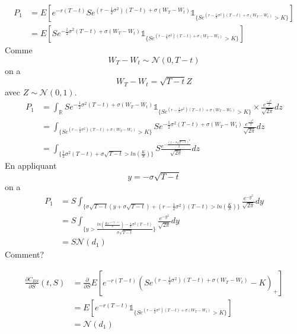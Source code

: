 \documentclass{article}
\theoremstyle{plain}
\theoremstyle{definition}
\begin{document}
\begin{equation}
\begin{split}
P_1&=E[e^{-r(T-t)}Se^{(r-\frac{1}{2}\sigma^2)(T-t)+\sigma(W_T-W_t)}\mathds{1}_{\{Se^{(r-\frac{1}{2}\sigma^2)(T-t)+\sigma(W_T-W_t)}>K\}}]\\
&=E[Se^{-\frac{1}{2}\sigma^2(T-t)+\sigma(W_T-W_t)}\mathds{1}_{\{Se^{(r-\frac{1}{2}\sigma^2)(T-t)+\sigma(W_T-W_t)}>K\}}]
\end{split}
\end{equation}
Comme
\begin{equation}
W_T-W_t\sim\mathcal{N}(0,T-t)
\end{equation}
on a
\begin{equation}
W_T-W_t=\sqrt{T-t}Z
\end{equation}
avec $Z\sim \mathcal{N}(0,1)$.
\begin{equation}
\begin{split}
P_1&=\int_{\mathbb{R}}Se^{-\frac{1}{2}\sigma^2(T-t)+\sigma(W_T-W_t)}\mathds{1}_{\{Se^{(r-\frac{1}{2}\sigma^2)(T-t)+\sigma(W_T-W_t)}>K\}}\times \frac{e^{\frac{-z^2}{2}}}{\sqrt{2\pi}}dz\\
&=\int_{\{Se^{(r-\frac{1}{2}\sigma^2)(T-t)+\sigma(W_T-W_t)}>K\}} Se^{-\frac{1}{2}\sigma^2(T-t)+\sigma(W_T-W_t)}\frac{e^{\frac{-z^2}{2}}}{\sqrt{2\pi}}dz\\
&=\int_{\{\frac{1}{2}\sigma^2(T-t)+\sigma\sqrt{T-t}>ln(\frac{K}{S})\}} S\frac{e^{-\frac{(z-\sigma\sqrt{T-t})^2}{2}}}{\sqrt{2\pi}}dz
\end{split}
\end{equation}
En appliquant
\begin{equation}
	y=-\sigma\sqrt{T-t}
\end{equation}
on a
\begin{equation}
\begin{split}
P_1&=S\int_{\{\sigma\sqrt{T-t}(y+\sigma\sqrt{T-t})+(r-\frac{1}{2}\sigma^2)(T-t)>ln(\frac{K}{S})\}}\frac{e^{-y^2}}{\sqrt{2\pi}}dy\\
&=S\int_{\{y>\frac{ln(\frac{Ke^{-r(T-t)}}{S})-\frac{1}{2}\sigma^2(T-t)}{\sigma\sqrt{T-t}}\}}\frac{e^{-y^2}}{\sqrt{2\pi}}dy\\
&=S\mathcal{N}(d_1)
\end{split}
\end{equation}
{\color{red} Comment?}

\begin{equation}
\begin{split}
\frac{\partial C_{BS}}{\partial S}(t,S)&=\frac{\partial}{\partial S}E[e^{-r(T-t)}(Se^{(r-\frac{1}{2}\sigma^2)(T-t)+\sigma(W_T-W_t)}-K)_+]\\
&=E[e^{-r(T-t)}\mathds{1}_{\{Se^{(r-\frac{1}{2}\sigma^2)(T-t)+\sigma(W_T-W_t)}>K\}}]\\
&=\mathcal{N}(d_1)
\end{split}
\end{equation}
\end{document}
